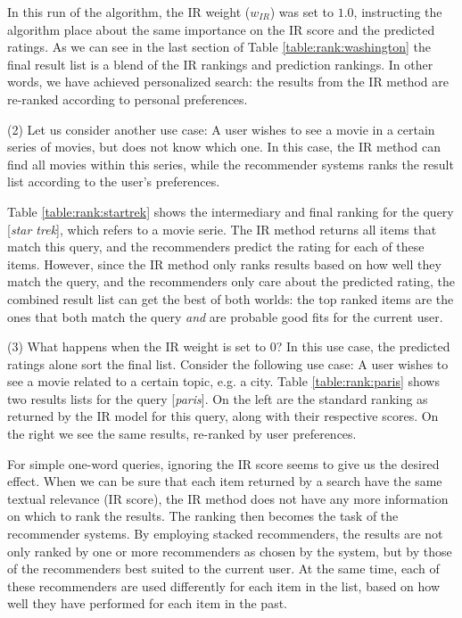In this run of the algorithm, the IR weight ($w_{IR}$) was set to $1.0$,
instructing the algorithm place about the same importance on the IR score
and the predicted ratings. As we can see in the last section of 
Table \ref{table:rank:washington} the final result list is a blend
of the IR rankings and prediction rankings.
In other words, we have achieved personalized search: the results
from the IR method are re-ranked according to personal preferences.


(2) Let us consider another use case:
A user wishes to see a movie in a certain series of movies,
but does not know which one. In this case, the IR method can find all movies within this series,
while the recommender systems ranks the result list according to the user's preferences.

Table \ref{table:rank:startrek} shows the intermediary and final ranking
for the query [\emph{star trek}], which refers to a movie serie.
The IR method returns all items that match this query,
and the recommenders predict the rating for each of these items.
However, since the IR method only ranks results based on how well they match the query,
and the recommenders only care about the predicted rating, the combined result
list can get the best of both worlds:
the top ranked items are the ones that both match the query \emph{and}
are probable good fits for the current user.

(3) What happens when the IR weight is set to $0$?
In this use case, the predicted ratings alone sort the final list.
Consider the following use case:
A user wishes to see a movie related to a certain topic, e.g. a city.
Table \ref{table:rank:paris} shows two results lists for the query [\emph{paris}].
On the left are the standard ranking as returned by the IR model for this query,
along with their respective scores.
On the right we see the same results, re-ranked by user preferences.

For simple one-word queries, ignoring the IR score seems to give us the desired effect.
When we can be sure that each item returned by a search have the same textual relevance
(IR score), the IR method does not have any more information on which to rank
the results. The ranking then becomes the task of the recommender systems.
By employing stacked recommenders, the results are not only ranked by 
one or more recommenders as chosen by the system, but by those of the recommenders
best suited to the current user. At the same time, each of these recommenders
are used differently for each item in the list, based on how well they have
performed for each item in the past.

